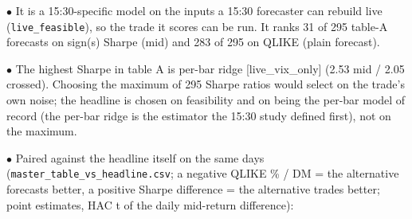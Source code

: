 \documentclass[10pt]{article}
\begin{document}
$\bullet$ It is a 15:30-specific model on the inputs a 15:30 forecaster can rebuild live (\texttt{live\_feasible}), so the trade it scores can be run. It ranks 31 of 295 table-A forecasts on sign(s) Sharpe (mid) and 283 of 295 on QLIKE (plain forecast).\par
$\bullet$ The highest Sharpe in table A is per-bar ridge [live\_vix\_only] (2.53 mid /\allowbreak{} 2.05 crossed). Choosing the maximum of 295 Sharpe ratios would select on the trade's own noise; the headline is chosen on feasibility and on being the per-bar model of record (the per-bar ridge is the estimator the 15:30 study defined first), not on the maximum.\par
$\bullet$ Paired against the headline itself on the same days (\texttt{master\_table\_vs\_headline.csv}; a negative QLIKE \% /\allowbreak{} DM = the alternative forecasts better, a positive Sharpe difference = the alternative trades better; point estimates, HAC t of the daily mid-return difference):\par
\begingroup\scriptsize\setlength{\tabcolsep}{2.5pt}
\end{document}
